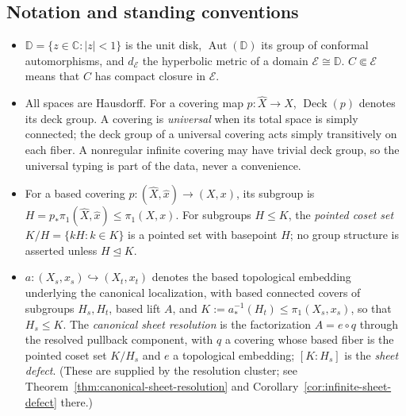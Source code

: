 \subsection*{Notation and standing conventions}

\begin{itemize}
\item \(\mathbb D=\{z\in\mathbb C:\lvert z\rvert<1\}\) is the unit disk, \(\operatorname{Aut}(\mathbb D)\) its group of conformal automorphisms, and \(d_{\mathcal E}\) the hyperbolic metric of a domain \(\mathcal E\cong\mathbb D\).  \(C\Subset\mathcal E\) means that \(C\) has compact closure in \(\mathcal E\).

\item All spaces are Hausdorff.  For a covering map \(p\colon\widehat X\to X\), \(\operatorname{Deck}(p)\) denotes its deck group.  A covering is \emph{universal} when its total space is simply connected; the deck group of a universal covering acts simply transitively on each fiber.  A nonregular infinite covering may have trivial deck group, so the universal typing is part of the data, never a convenience.

\item For a based covering \(p\colon(\widehat X,\widehat x)\to(X,x)\), its subgroup is \(H=p_*\pi_1(\widehat X,\widehat x)\le\pi_1(X,x)\).  For subgroups \(H\le K\), the \emph{pointed coset set} \(K/H=\{kH:k\in K\}\) is a pointed set with basepoint \(H\); no group structure is asserted unless \(H\trianglelefteq K\).

\item \(a\colon(X_s,x_s)\hookrightarrow(X_t,x_t)\) denotes the based topological embedding underlying the canonical localization, with based connected covers of subgroups \(H_s,H_t\), based lift \(A\), and \(K:=a_*^{-1}(H_t)\le\pi_1(X_s,x_s)\), so that \(H_s\le K\).  The \emph{canonical sheet resolution} is the factorization \(A=e\circ q\) through the resolved pullback component, with \(q\) a covering whose based fiber is the pointed coset set \(K/H_s\) and \(e\) a topological embedding; \([K:H_s]\) is the \emph{sheet defect}.  (These are supplied by the resolution cluster; see Theorem~\ref{thm:canonical-sheet-resolution} and Corollary~\ref{cor:infinite-sheet-defect} there.)


\end{itemize}

